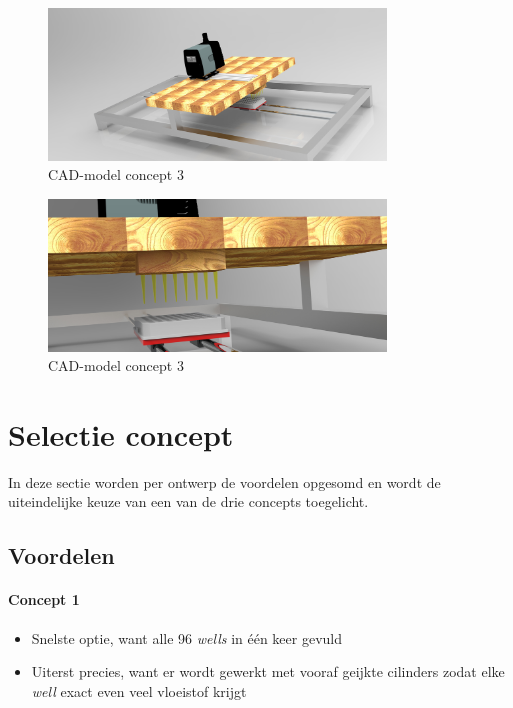 \documentclass[a4paper,twoside,kulak]{kulakreport} %
\begin{document}
\begin{figure}[h]
	\centering
	\includegraphics[width=0.8\textwidth]{micdis1.jpg}
	\caption{CAD-model concept 3}
	\label{fig: CAD-model globaal}
	
\end{figure} 

\begin{figure}[h]
	\centering
	\includegraphics[width=0.8\textwidth]{micdis2.jpg}
	\caption{CAD-model concept 3}
	\label{fig: CAD-model ingezoomd}
	
\end{figure} 

\section{Selectie concept}
In deze sectie worden per ontwerp de voordelen opgesomd en wordt de uiteindelijke keuze van een van de drie concepts toegelicht.

\subsection{Voordelen}

\paragraph{Concept 1}
\begin{itemize}
	\item Snelste optie, want alle 96 \textit{wells} in één keer gevuld
	\item Uiterst precies, want er wordt gewerkt met vooraf geijkte cilinders zodat elke 	\textit{well} exact even veel vloeistof krijgt
\end{itemize}
\end{document}
